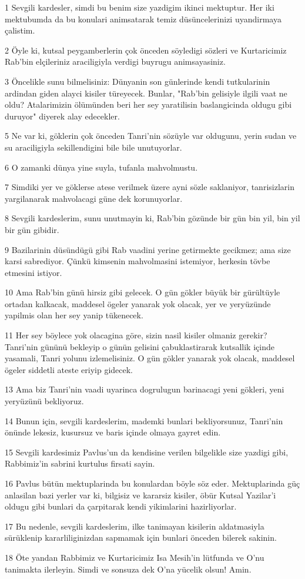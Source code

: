 \par 1 Sevgili kardesler, simdi bu benim size yazdigim ikinci mektuptur. Her iki mektubumda da bu konulari animsatarak temiz düsüncelerinizi uyandirmaya çalistim.
\par 2 Öyle ki, kutsal peygamberlerin çok önceden söyledigi sözleri ve Kurtaricimiz Rab'bin elçileriniz araciligiyla verdigi buyrugu animsayasiniz.
\par 3 Öncelikle sunu bilmelisiniz: Dünyanin son günlerinde kendi tutkularinin ardindan giden alayci kisiler türeyecek. Bunlar, "Rab'bin gelisiyle ilgili vaat ne oldu? Atalarimizin ölümünden beri her sey yaratilisin baslangicinda oldugu gibi duruyor" diyerek alay edecekler.
\par 5 Ne var ki, göklerin çok önceden Tanri'nin sözüyle var oldugunu, yerin sudan ve su araciligiyla sekillendigini bile bile unutuyorlar.
\par 6 O zamanki dünya yine suyla, tufanla mahvolmustu.
\par 7 Simdiki yer ve göklerse atese verilmek üzere ayni sözle saklaniyor, tanrisizlarin yargilanarak mahvolacagi güne dek korunuyorlar.
\par 8 Sevgili kardeslerim, sunu unutmayin ki, Rab'bin gözünde bir gün bin yil, bin yil bir gün gibidir.
\par 9 Bazilarinin düsündügü gibi Rab vaadini yerine getirmekte gecikmez; ama size karsi sabrediyor. Çünkü kimsenin mahvolmasini istemiyor, herkesin tövbe etmesini istiyor.
\par 10 Ama Rab'bin günü hirsiz gibi gelecek. O gün gökler büyük bir gürültüyle ortadan kalkacak, maddesel ögeler yanarak yok olacak, yer ve yeryüzünde yapilmis olan her sey yanip tükenecek.
\par 11 Her sey böylece yok olacagina göre, sizin nasil kisiler olmaniz gerekir? Tanri'nin gününü bekleyip o günün gelisini çabuklastirarak kutsallik içinde yasamali, Tanri yolunu izlemelisiniz. O gün gökler yanarak yok olacak, maddesel ögeler siddetli ateste eriyip gidecek.
\par 13 Ama biz Tanri'nin vaadi uyarinca dogrulugun barinacagi yeni gökleri, yeni yeryüzünü bekliyoruz.
\par 14 Bunun için, sevgili kardeslerim, mademki bunlari bekliyorsunuz, Tanri'nin önünde lekesiz, kusursuz ve baris içinde olmaya gayret edin.
\par 15 Sevgili kardesimiz Pavlus'un da kendisine verilen bilgelikle size yazdigi gibi, Rabbimiz'in sabrini kurtulus firsati sayin.
\par 16 Pavlus bütün mektuplarinda bu konulardan böyle söz eder. Mektuplarinda güç anlasilan bazi yerler var ki, bilgisiz ve kararsiz kisiler, öbür Kutsal Yazilar'i oldugu gibi bunlari da çarpitarak kendi yikimlarini hazirliyorlar.
\par 17 Bu nedenle, sevgili kardeslerim, ilke tanimayan kisilerin aldatmasiyla sürüklenip kararliliginizdan sapmamak için bunlari önceden bilerek sakinin.
\par 18 Öte yandan Rabbimiz ve Kurtaricimiz Isa Mesih'in lütfunda ve O'nu tanimakta ilerleyin. Simdi ve sonsuza dek O'na yücelik olsun! Amin.


